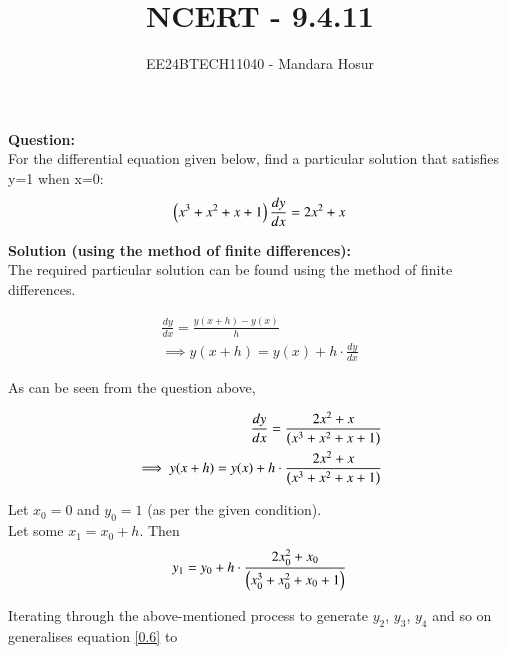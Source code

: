 \documentclass[journal]{IEEEtran}
\begin{document}

\vspace{3cm}

\title{NCERT - 9.4.11}
\author{EE24BTECH11040 - Mandara Hosur}
{\let\newpage\relax\maketitle}

\renewcommand{\thefigure}{\theenumi}
\renewcommand{\thetable}{\theenumi}
\setlength{\intextsep}{10pt} %


\renewcommand{\thetable}{\theenumi}

\textbf{Question:}\\
For the differential equation given below, find a particular solution that satisfies y=1 when x=0:
\begin{align}
\left(x^3 + x^2 + x + 1\right)\frac{dy}{dx} = 2x^2 + x
\end{align}

\textbf{Solution (using the method of finite differences):} \\
The required particular solution can be found using the method of finite differences. 

\begin{align}
\frac{dy}{dx} = \frac{y(x+h) - y(x)}{h} \\
\implies y(x+h) = y(x) + h\cdot\frac{dy}{dx}
\end{align}

As can be seen from the question above,

\begin{align}
\frac{dy}{dx} = \frac{2x^2 + x}{\left(x^3 + x^2 + x + 1\right)} \\
\implies y(x+h) = y(x) + h\cdot\frac{2x^2 + x}{\left(x^3 + x^2 + x + 1\right)}
\end{align}

Let $x_0 = 0$ and $y_0 = 1$ (as per the given condition). \\
Let some $x_1 = x_0 + h$. Then
\begin{align}
y_1 = y_0 + h\cdot\frac{2x_0^2 + x_0}{\left(x_0^3 + x_0^2 + x_0 + 1\right)}
\label{0.6}
\end{align}

Iterating through the above-mentioned process to generate $y_2$, $y_3$, $y_4$ and so on generalises equation \eqref{0.6} to
\end{document}
